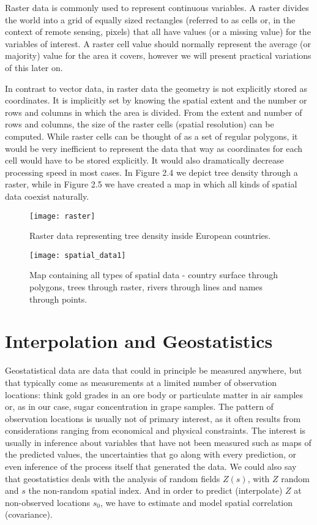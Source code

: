 \documentclass[12pt,a4paper,oneside]{book}
\theoremstyle{plain}
\theoremstyle{definition}
\begin{document}
{\vspace{2mm}
\noindent
Raster data is commonly used to represent continuous variables. A raster divides the world into a grid of equally sized rectangles (referred to as cells or, in the context of remote sensing, pixels) that all have  values (or a missing value) for the variables of interest. A raster cell value should normally represent the average (or majority) value for the area it covers, however we will present practical variations of this later on. 

\vspace{3mm}\noindent
In contrast to vector data, in raster data the geometry is not explicitly stored as coordinates. It is implicitly set by knowing the spatial extent and the number or rows and columns in which the area is divided. From the extent and number of rows and columns, the size of the raster cells (spatial resolution) can be computed. While raster cells can be thought of as a set of regular polygons, it would be very inefficient to represent the data that way as coordinates for each cell would have to be stored explicitly. It would also dramatically decrease processing speed in most cases. In Figure 2.4 we depict tree density through a raster, while in Figure 2.5 we have created a map in which all kinds of spatial data coexist naturally. 
\begin{figure}
\begin{center}
\texttt{[image: raster]}
\caption{Raster data representing tree density inside European countries.}
\end{center}
\end{figure}
\begin{figure}
\begin{center}
\texttt{[image: spatial\_data1]}
\caption{Map containing all types of spatial data - country surface through polygons, trees through raster, rivers through lines and names through points.}
\end{center}
\end{figure}

\section{Interpolation and Geostatistics}
Geostatistical data are data that could in principle be measured anywhere, but that typically come as measurements at a limited number of observation locations: think gold grades in an ore body or particulate matter in air samples or, as in our case, sugar concentration in grape samples. The pattern of observation locations is usually not of primary interest, as it often results from considerations ranging from economical and physical constraints. The interest is usually in inference about variables that have not been measured such as maps of the predicted values, the uncertainties that go along with every prediction, or even inference of the process itself that generated the data. We could also say that geostatistics deals with the analysis of random fields $Z(s)$, with $Z$ random and $s$ the non-random spatial index. And in order to predict (interpolate) $Z$ at non-observed locations $s_0$, we have to estimate and model spatial correlation (covariance). 

}
\end{document}
